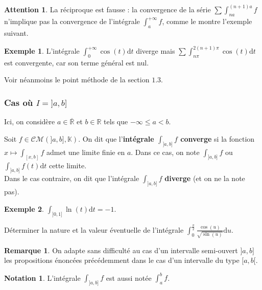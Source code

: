 \documentclass[french]{article}
\newcommand{\R}{\mathbb{R}}
\newcommand{\K}{\mathbb{K}}
\renewcommand{\d}{\text{d}}
\theoremstyle{plain}
\theoremstyle{definition}
\newtheorem*{ex}{Exemple}
\newtheorem*{rmq}{Remarque}
\newtheorem*{notation}{Notation}
\newtheorem*{attention}{Attention}
\theoremstyle{remark}
\begin{document}
\begin{attention}
	La réciproque est fausse : la convergence de la série $\displaystyle\sum \int_{na}^{(n+1)a}f$ n'implique pas la convergence de l'intégrale $\displaystyle\int_{a}^{+\infty}f$, comme le montre l'exemple suivant.
\end{attention}

\begin{ex}
	L'intégrale $\int_{0}^{+\infty}\cos(t)\d t$ diverge mais $\displaystyle\sum \int_{n\pi}^{2(n+1)\pi}\cos(t)\d t$ est convergente, car son terme général est nul.
\end{ex}

Voir néanmoins le point méthode de la section $1.3$.

\subsubsection*{Cas où $I=]a,b]$}

Ici, on considère $a\in\overline{\R}$ et $b\in\R$ tels que $-\infty\leqslant a<b$.

\begin{dfn}
	Soit $f\in\mathcal{CM}(]a,b],\K)$.
	On dit que l'\textbf{intégrale $\displaystyle\int_{]a,b]}f$ converge} si la fonction $x\mapsto\displaystyle\int_{[x,b]}f$ admet une limite finie en $a$. Dans ce cas, on note $\displaystyle\int_{]a,b]}f$ ou $\displaystyle\int_{]a,b]}f(t)\d t$ cette limite.\\
	Dans le cas contraire, on dit que l'intégrale $\displaystyle\int_{]a,b]}f$ \textbf{diverge} (et on ne la note pas).
\end{dfn}

\begin{ex}
	$\displaystyle\int_{]0,1]}\ln(t)\d t=-1$.
\end{ex}

\begin{exo}
	Déterminer la nature et la valeur éventuelle de l'intégrale $\displaystyle\int_{0}^{\frac{\pi}{2}}\frac{\cos(u)}{\sqrt{\sin(u)}}\d u$.
\end{exo}

\begin{rmq}
	On adapte sans difficulté au cas d'un intervalle semi-ouvert $]a,b]$ les propositions énoncées précédemment dans le cas d'un intervalle du type $[a,b[$.
\end{rmq}

\begin{notation}
	L'intégrale $\displaystyle\int_{]a,b]}f$ est aussi notée $\displaystyle\int_{a}^{b}f$.
\end{notation}
\end{document}
